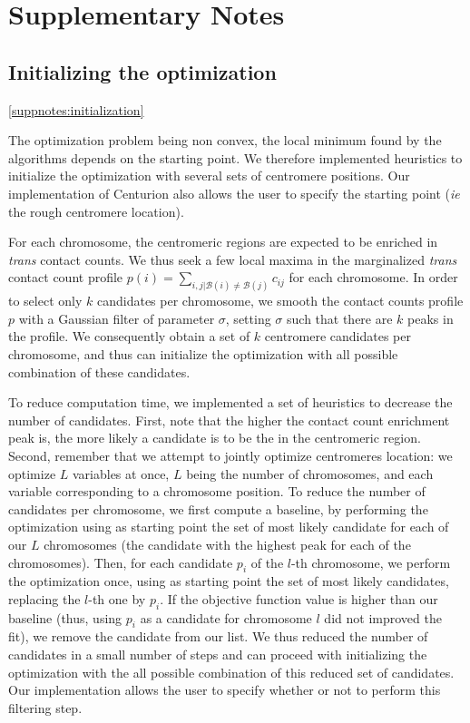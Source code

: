 \section*{Supplementary Notes}

\subsection*{Initializing the optimization}
\ref{suppnotes:initialization}

The optimization problem being non convex, the local minimum found by the
algorithms depends on the starting point. We therefore implemented heuristics
to initialize the optimization with several sets of centromere positions. Our
implementation of Centurion also allows the user to specify the starting point
(\textit{ie} the rough centromere location).

For each chromosome, the centromeric regions are expected to be enriched in
\textit{trans} contact counts. We thus seek a few local maxima in the
marginalized \textit{trans} contact count profile $p(i) = \sum_{i, j |
\mathcal{B}(i) \neq \mathcal{B}(j)} c_{ij}$ for each chromosome. In order to
select only $k$ candidates per chromosome, we smooth the contact counts
profile $p$ with a Gaussian filter of parameter $\sigma$, setting $\sigma$
such that there are $k$ peaks in the profile. We consequently obtain a set of
$k$ centromere candidates per chromosome, and thus can initialize the
optimization with all possible combination of these candidates.

To reduce computation time, we implemented a set of heuristics to decrease the
number of candidates. First, note that the higher the contact count enrichment
peak is, the more likely a candidate is to be the in the centromeric region.
Second, remember that we attempt to jointly optimize centromeres location: we
optimize $L$ variables at once, $L$ being the number of chromosomes, and each
variable corresponding to a chromosome position. To reduce the number of
candidates per chromosome, we first compute a baseline, by performing the
optimization using as starting point the set of most likely candidate for each
of our $L$ chromosomes (the candidate with the highest
peak for each of the chromosomes). Then, for each candidate $p_i$ of the $l$-th
chromosome, we perform the optimization once, using as starting point the set
of most likely candidates, replacing the $l$-th one by $p_i$. If the objective
function value is higher than our baseline (thus, using $p_i$ as a candidate
for chromosome $l$ did not improved the fit), we remove the candidate from our
list. We thus reduced the number of candidates in a small number of steps and
can proceed with initializing the optimization with the all possible
combination of this reduced set of candidates. Our implementation allows the
user to specify whether or not to perform this filtering step.
